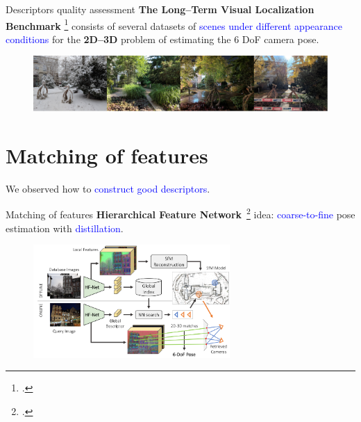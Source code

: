 \documentclass[aspectratio=169]{beamer}
\newcommand{\sh}{0.2cm}
\begin{document}
\begin{frame}{Descriptors quality assessment}
\textbf{The Long--Term Visual Localization Benchmark} \footcite{visual_loc}  consists of several datasets of \textcolor{blue}{scenes under different appearance conditions} for the \textbf{2D--3D} problem of estimating the 6 DoF camera pose.
\begin{figure}
\centering
\includegraphics[width=13cm]{SemCSE_longterm}
\end{figure}
\end{frame}


\section{Matching of features}
\begin{frame}
\centering \Large We observed how to \textcolor{blue}{construct good descriptors}.\\
\vspace{\sh}
\vspace{\sh}
\vspace{\sh}
\vspace{\sh}
\end{frame}


\begin{frame}{Matching of features}
\hspace{-0.5cm}\textbf{Hierarchical Feature Network}~\footcite{Sarlin2019b} idea: \textcolor{blue}{coarse-to-fine} pose estimation with \textcolor{blue}{distillation}.
\begin{itemize}
\end{itemize}
\begin{figure}
	\centering
\includegraphics[width=7.5cm]{SemCSE_HF}
\end{figure}
\end{frame}
\end{document}
